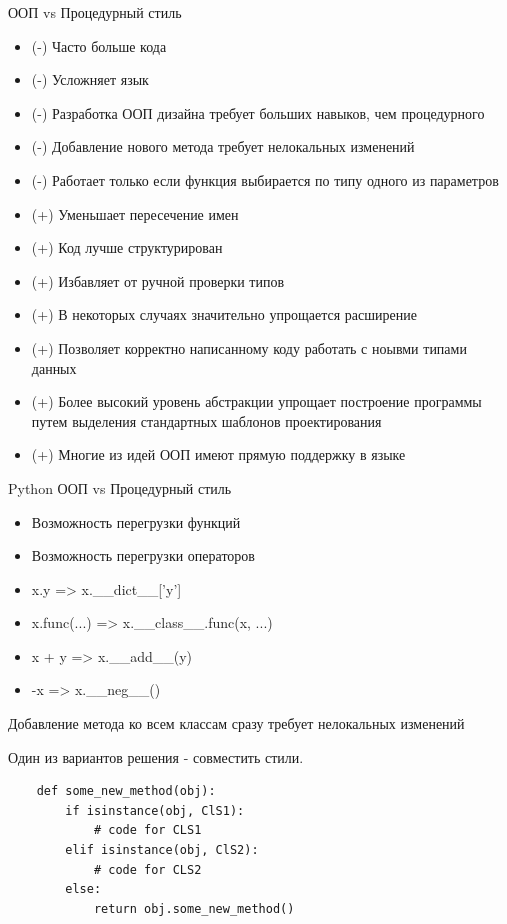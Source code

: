 \documentclass{article}
\begin{document}
\begin{center} ООП vs Процедурный стиль \end{center}
\begin{itemize}
    \item (-) Часто больше кода
    \item (-) Усложняет язык
    \item (-) Разработка ООП дизайна требует больших навыков, чем процедурного
    \item (-) Добавление нового метода требует нелокальных изменений
    \item (-) Работает только если функция выбирается по типу одного из параметров
    \item (+) Уменьшает пересечение имен
    \item (+) Код лучше структурирован
    \item (+) Избавляет от ручной проверки типов
    \item (+) В некоторых случаях значительно упрощается расширение
    \item (+) Позволяет корректно написанному коду работать с ноывми типами данных
    \item (+) Более высокий уровень абстракции упрощает построение программы
              путем выделения стандартных шаблонов проектирования
    \item (+) Многие из идей ООП имеют прямую поддержку в языке
\end{itemize}
\newpage

\begin{center} Python ООП vs Процедурный стиль \end{center}
\begin{itemize}
    \item Возможность перегрузки функций
    \item Возможность перегрузки операторов
    \item x.y => x.\_\_dict\_\_['y']
    \item x.func(...) => x.\_\_class\_\_.func(x, ...)
    \item x + y => x.\_\_add\_\_(y)
    \item -x => x.\_\_neg\_\_()
\end{itemize}
\newpage

\begin{center} Добавление метода ко всем классам сразу требует нелокальных изменений \end{center}
Один из вариантов решения - совместить стили.
\begin{lstlisting}
    def some_new_method(obj):
        if isinstance(obj, ClS1):
            # code for CLS1
        elif isinstance(obj, ClS2):
            # code for CLS2
        else:
            return obj.some_new_method()
\end{lstlisting}
\newpage
\end{document}
